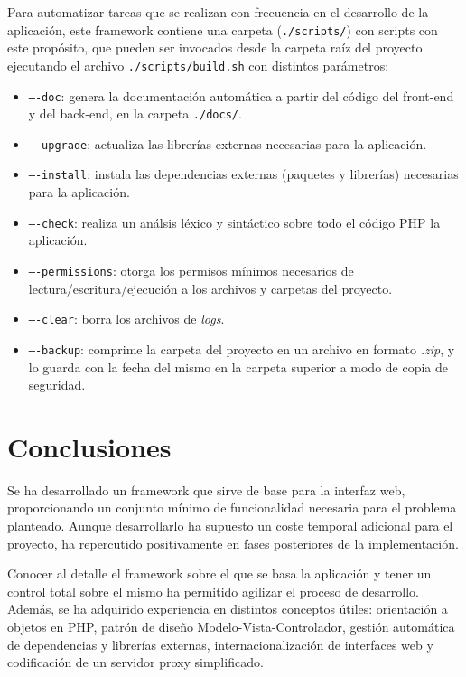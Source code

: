 Para automatizar tareas que se realizan con frecuencia en el desarrollo de la aplicación, este \gls{framework} contiene una carpeta (\texttt{./scripts/}) con \glspl{script} con este propósito, que pueden ser invocados desde la carpeta raíz del proyecto ejecutando el archivo \texttt{./scripts/build.sh} con distintos parámetros:
\begin{itemize}
  \item \texttt{----doc}: genera la documentación automática a partir del código del \gls{front-end} y del \gls{back-end}, en la carpeta \texttt{./docs/}.
  \item \texttt{----upgrade}: actualiza las librerías externas necesarias para la aplicación.
  \item \texttt{----install}: instala las dependencias externas (paquetes y librerías) necesarias para la aplicación.
  \item \texttt{----check}: realiza un análsis léxico y sintáctico sobre todo el código \gls{PHP} la aplicación. 
  \item \texttt{----permissions}: otorga los permisos mínimos necesarios de lectura/escritura/ejecución a los archivos y carpetas del proyecto.
  \item \texttt{----clear}: borra los archivos de \textit{logs}.
  \item \texttt{----backup}: comprime la carpeta del proyecto en un archivo en formato \textit{.zip}, y lo guarda con la fecha del mismo en la carpeta superior a modo de copia de seguridad.
\end{itemize}

\section{Conclusiones\label{extra:mvc:conclusiones}}

Se ha desarrollado un \gls{framework} que sirve de base para la interfaz web, proporcionando un conjunto mínimo de funcionalidad necesaria para el problema planteado. Aunque desarrollarlo ha supuesto un coste temporal adicional para el proyecto, ha repercutido positivamente en fases posteriores de la implementación.

Conocer al detalle el \gls{framework} sobre el que se basa la aplicación y tener un control total sobre el mismo ha permitido agilizar el proceso de desarrollo. Además, se ha adquirido experiencia en distintos conceptos útiles: orientación a objetos en \gls{PHP}, patrón de diseño Modelo-Vista-Controlador, gestión automática de dependencias y librerías externas, internacionalización de interfaces web y codificación de un servidor \gls{proxy} simplificado.